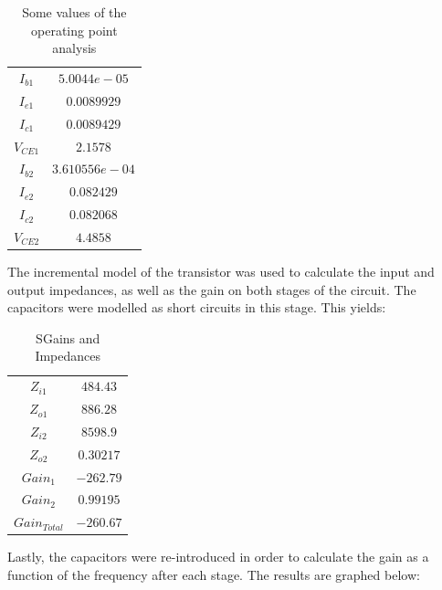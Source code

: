 \begin{table}[H]
    \addtolength{\tabcolsep}{-4pt}
    \caption{Some values of the operating point analysis}
    \vspace{-3mm}
    \begin{tabular}{|c|c|}
    \hline
    $I_{b1}$ &  $5.0044e-05$\\
    $I_{e1}$ &  $0.0089929$\\
    $I_{c1}$ &  $0.0089429$  \\ 
    $V_{CE1}$ & $ 2.1578$\\
    $I_{b2}$ &  $3.610556e-04$ \\
    $I_{e2}$ &  $0.082429$\\
    $I_{c2}$ &  $0.082068$\\
    $V_{CE2}$ & $4.4858$\\
    \hline
    \end{tabular}
    \label{tab:OP_mat}
\end{table}

The incremental model of the transistor was used to calculate the input and output impedances, as well as
the gain on both stages of the circuit. The capacitors were modelled as short circuits in this stage. This yields:

\begin{table}[H]
    \addtolength{\tabcolsep}{-4pt}
    \caption{SGains and Impedances}
    \vspace{-3mm}
    \begin{tabular}{|c|c|}
    \hline
    $Z_{i1}$ &  $484.43$\\
    $Z_{o1}$ &  $886.28$\\
    $Z_{i2}$ &  $8598.9$\\
    $Z_{o2}$ &  $0.30217$\\
    $Gain_1$ & $-262.79$\\
    $Gain_2$ &  $0.99195$\\
    $Gain_{Total}$ & $-260.67$\\
    \hline
    \end{tabular}
    \label{tab:Z_mat}
\end{table}

Lastly, the capacitors were re-introduced in order to calculate the gain as a function of the frequency after each stage.
The results are graphed below:

